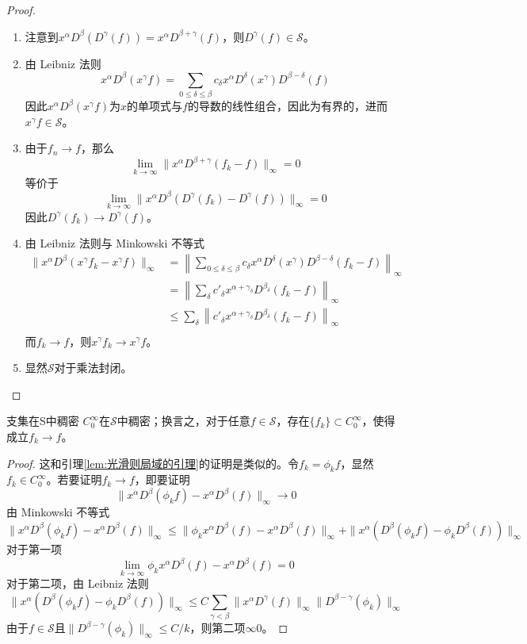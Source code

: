 \documentclass[lang = cn, %
scheme = chinese          %
]
{elegantbook}             %
\newcommand{\sub}{\subset}             %
\begin{document}
\begin{proof}
	\begin{enumerate}
		\item 注意到$x^\alpha D^\beta (D^\gamma (f))=x^\alpha D^{\beta+\gamma}(f)$，则$D^\gamma (f)\in \mathcal{S}$。
		\item 由 Leibniz 法则
		\[
		x^\alpha D^\beta(x^\gamma f)
		=\sum_{0\le\delta\le\beta}c_\delta x^\alpha D^\delta(x^\gamma)D^{\beta-\delta}(f)
		\]
		因此$x^\alpha D^\beta(x^\gamma f)$为$x$的单项式与$f$的导数的线性组合，因此为有界的，进而$x^\gamma f\in\mathcal{S}$。
		\item 由于$f_n\to f$，那么
		\[
		\lim_{k\to\infty}\|x^\alpha D^{\beta+\gamma}(f_k-f)\|_\infty=0
		\]
		等价于
		\[
		\lim_{k\to\infty}\|x^\alpha D^{\beta}(D^{\gamma}(f_k)-D^{\gamma}(f))\|_\infty=0
		\]
		因此$D^\gamma(f_k)\to D^\gamma(f)$。
		\item 由 Leibniz 法则与 Minkowski 不等式
		\begin{align*}
			\| x^\alpha D^\beta(x^\gamma f_k-x^\gamma f) \|_\infty
			& = \left\|\sum_{0\le\delta\le\beta}c_\delta x^\alpha D^\delta(x^\gamma)D^{\beta-\delta}(f_k-f) \right\|_\infty \\
			& = \left\|\sum_{\delta}c'_\delta x^{\alpha+\gamma_\delta}D^{\beta_\delta}(f_k-f) \right\|_\infty \\
			& \le \sum_{\delta}\left\|c'_\delta x^{\alpha+\gamma_\delta}D^{\beta_\delta}(f_k-f) \right\|_\infty \\
		\end{align*}
		而$f_k\to f$，则$x^\gamma f_k\to x^\gamma f$。
		\item 显然$\mathcal{S}$对于乘法封闭。
	\end{enumerate}
\end{proof}

\begin{proposition}{}{支集在S中稠密}
	$C_0^\infty$在$\mathcal{S}$中稠密；换言之，对于任意$f\in\mathcal{S}$，存在$\{ f_k \}\sub C_0^\infty$，使得成立$f_k\to f$。
\end{proposition}

\begin{proof}
	这和引理\ref{lem:光滑则局域的引理}的证明是类似的。令$f_k=\phi_k f$，显然$f_k\in C_0^\infty$。若要证明$f_k\to f$，即要证明
	\[
	\|  x^\alpha D^\beta(\phi_k f)- x^\alpha D^\beta(f) \|_\infty\to 0
	\]
	由 Minkowski 不等式
	\[
	\|  x^\alpha D^\beta(\phi_k f)- x^\alpha D^\beta(f) \|_\infty
	\le \|  \phi_kx^\alpha D^\beta(f)- x^\alpha D^\beta(f) \|_\infty
	+\|  x^\alpha(D^\beta(\phi_k f)- \phi_k D^\beta(f)) \|_\infty
	\]
	对于第一项
	\[
	\lim_{k\to\infty}\phi_kx^\alpha D^\beta(f)- x^\alpha D^\beta(f)=0
	\]
	对于第二项，由 Leibniz 法则
	\[
	\|  x^\alpha(D^\beta(\phi_k f)- \phi_k D^\beta(f)) \|_\infty
	\le C\sum_{\gamma <\beta}\|x^\alpha D^\gamma (f) \|_\infty \|D^{\beta-\gamma}(\phi_k) \|_\infty
	\]
	由于$f\in\mathcal{S}$且$\|D^{\beta-\gamma}(\phi_k) \|_\infty\le C/k$，则第二项$\infty0$。
\end{proof}
\end{document}
